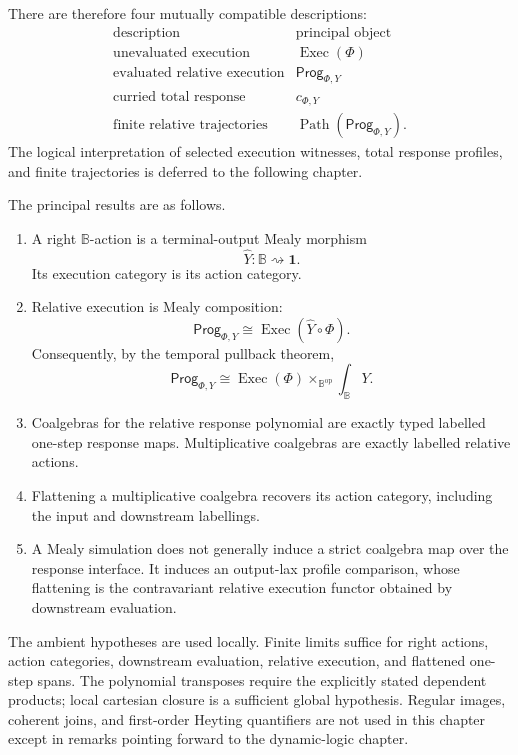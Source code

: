 There are therefore four mutually compatible descriptions:
\[
\begin{array}{c|c}
    \text{description} & \text{principal object} \\
    \hline
    \text{unevaluated execution} & \operatorname{Exec}(\Phi) \\
    \text{evaluated relative execution} & \mathsf{Prog}_{\Phi,Y} \\
    \text{curried total response} & c_{\Phi,Y} \\
    \text{finite relative trajectories} &
        \operatorname{Path}(\mathsf{Prog}_{\Phi,Y}).
\end{array}
\]
The logical interpretation of selected execution witnesses, total response
profiles, and finite trajectories is deferred to the following chapter.

The principal results are as follows.
\begin{enumerate}
    \item A right \(\mathbb B\)-action is a terminal-output Mealy morphism
    \[
        \widehat Y:\mathbb B\rightsquigarrow\mathbf 1.
    \]
    Its execution category is its action category.

    \item Relative execution is Mealy composition:
    \[
        \mathsf{Prog}_{\Phi,Y}
        \cong
        \operatorname{Exec}(\widehat Y\circ\Phi).
    \]
    Consequently, by the temporal pullback theorem,
    \[
        \mathsf{Prog}_{\Phi,Y}
        \cong
        \operatorname{Exec}(\Phi)
        \times_{\mathbb B^{\mathrm{op}}}
        \int_{\mathbb B}Y.
    \]

    \item Coalgebras for the relative response polynomial are exactly typed
    labelled one-step response maps.  Multiplicative coalgebras are exactly
    labelled relative actions.

    \item Flattening a multiplicative coalgebra recovers its action category,
    including the input and downstream labellings.

    \item A Mealy simulation does not generally induce a strict coalgebra map
    over the response interface.  It induces an output-lax profile
    comparison, whose flattening is the contravariant relative execution
    functor obtained by downstream evaluation.
\end{enumerate}

The ambient hypotheses are used locally.  Finite limits suffice for right
actions, action categories, downstream evaluation, relative execution, and
flattened one-step spans.  The polynomial transposes require the explicitly
stated dependent products; local cartesian closure is a sufficient global
hypothesis.  Regular images, coherent joins, and first-order Heyting
quantifiers are not used in this chapter except in remarks pointing forward
to the dynamic-logic chapter.

